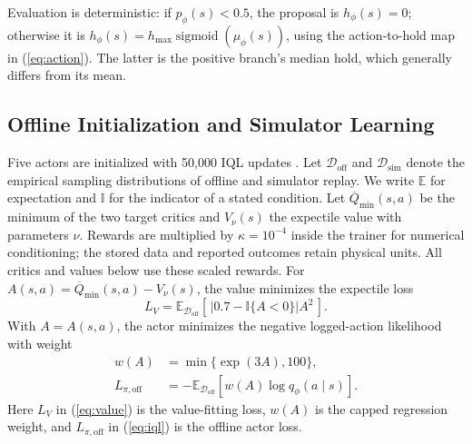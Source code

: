 \documentclass[letterpaper,journal]{IEEEtran}
\newcommand{\E}{\mathbb{E}}
\newcommand{\ind}{\mathbb{I}}
\newcommand{\sigmoid}{\operatorname{sigmoid}}
\newcommand{\Qmin}{\overline{Q}_{\min}}
\newcommand{\hmax}{h_{\max}}
\begin{document}
Evaluation is deterministic: if \(p_\phi(s)<0.5\), the proposal is \(h_\phi(s)=0\); otherwise it is \(h_\phi(s)=\hmax\sigmoid(\mu_\phi(s))\), using the action-to-hold map in (\ref{eq:action}). The latter is the positive branch's median hold, which generally differs from its mean.

\subsection{Offline Initialization and Simulator Learning}
Five actors are initialized with 50,000 IQL updates \cite{kostrikov2022iql}. Let \(\mathcal D_{\mathrm{off}}\) and \(\mathcal D_{\mathrm{sim}}\) denote the empirical sampling distributions of offline and simulator replay. We write \(\E\) for expectation and \(\ind\) for the indicator of a stated condition. Let \(\Qmin(s,a)\) be the minimum of the two target critics and \(V_\nu(s)\) the expectile value with parameters \(\nu\). Rewards are multiplied by \(\kappa=10^{-4}\) inside the trainer for numerical conditioning; the stored data and reported outcomes retain physical units. All critics and values below use these scaled rewards. For \(A(s,a)=\Qmin(s,a)-V_\nu(s)\), the value minimizes the expectile loss
\begin{equation}
 L_V=\E_{\mathcal D_{\mathrm{off}}}
       [\,|0.7-\ind\{A<0\}|A^2\,].
 \label{eq:value}
\end{equation}
With \(A=A(s,a)\), the actor minimizes the negative logged-action likelihood with weight
\begin{equation}
\begin{aligned}
 w(A)&=\min\{\exp(3A),100\},\\
 L_{\pi,\mathrm{off}}&=-\E_{\mathcal D_{\mathrm{off}}}
                 [w(A)\log q_\phi(a\mid s)] .
\end{aligned}
 \label{eq:iql}
\end{equation}
Here \(L_V\) in (\ref{eq:value}) is the value-fitting loss, \(w(A)\) is the capped regression weight, and \(L_{\pi,\mathrm{off}}\) in (\ref{eq:iql}) is the offline actor loss.
\end{document}
